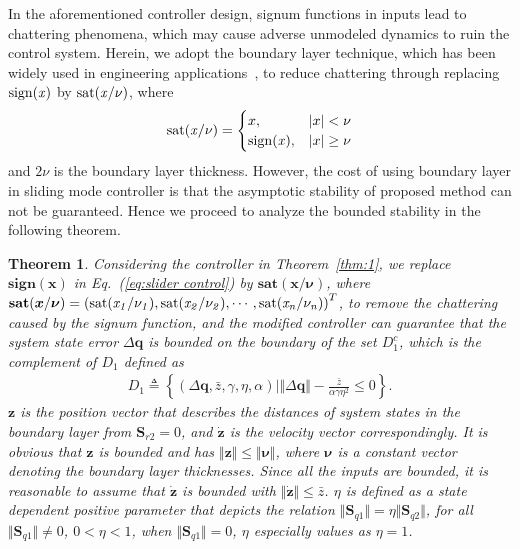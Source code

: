 \documentclass[3p]{elsarticle}
\theoremstyle{plain}
\newtheorem{mythm}{Theorem}
\theoremstyle{remark}
\begin{document}
In the aforementioned controller design, signum functions in inputs lead to chattering phenomena, which may cause adverse unmodeled dynamics to ruin the control system. Herein, we adopt the boundary layer technique, which has been widely used in engineering applications~\cite{Youndg1999A,Hwang1996sliding,In2000Robust,Chen2005,Yu2009sliding,Jin2009Practical,Al2004sliding}, to reduce chattering through replacing $\rm{sign}\it{(x)}$ by $\rm{sat}\it{(x/\nu)}$, where
\begin{align}
\rm{sat}\it{(x/\nu)}=
\begin{cases}
x,&\vert x\vert <\nu\\
\rm{sign}\it{(x)},&\vert x\vert\ge\nu
\end{cases}
\end{align}
and $2\nu$ is the boundary layer thickness. However, the cost of using boundary layer in sliding mode controller is that the asymptotic stability of proposed method can not be guaranteed. Hence we proceed to analyze the bounded stability in the following theorem.
\begin{mythm}\label{thm:boundary}
Considering the controller in Theorem~\ref{thm:1}, we replace $\mathbf{sign}{(\bm{x})}$ in Eq.~(\ref{eq:slider control}) by $\mathbf{sat}{(\boldsymbol {x/\nu})}$, where $\mathbf{sat}{(\boldsymbol{x}/\boldsymbol{\nu})}=\left(\rm{sat}\it{(x_1/\nu_1)},\rm{sat}\it{(x_2/\nu_2)},\cdots,\rm{sat}\it{(x_n/\nu_n)}\right)^T$, to remove the chattering caused by the signum function, and the modified controller can guarantee that the system state error $\Delta\bm q$ is bounded on the boundary of the set $D_1^c$, which is the complement of $D_1$ defined as
\begin{align}
  D_1\triangleq\left\{\left(\Delta\bm q,\bar z,\gamma,\eta,\alpha\right)\Big\vert\Vert\Delta\bm q\Vert-\frac{\bar z}{\alpha\gamma\eta^2}\le 0\right\}.
\end{align}
$\bm z$ is the position vector that describes the distances of system states in the boundary layer from $\bm S_{r2}=0$, and $\dot{\bm z}$ is the velocity vector correspondingly. It is obvious that $\bm z$ is bounded and has $\Vert\bm z\Vert\le\Vert\bm\nu\Vert$, where $\bm\nu$ is a constant vector denoting the boundary layer thicknesses. Since all the inputs are bounded, it is reasonable to assume that $\dot{\bm z}$ is bounded with $\Vert\dot{\bm z}\Vert\le \bar z$. $\eta$ is defined as a state dependent positive parameter that depicts the relation $\Vert\bm S_{q1}\Vert=\eta\Vert\bm S_{q2}\Vert$, for all $\Vert\bm S_{q1}\Vert\neq 0$, $0<\eta<1$, when $\Vert\bm S_{q1}\Vert= 0$, $\eta$ especially values as $\eta = 1$.
\end{mythm}
\end{document}
